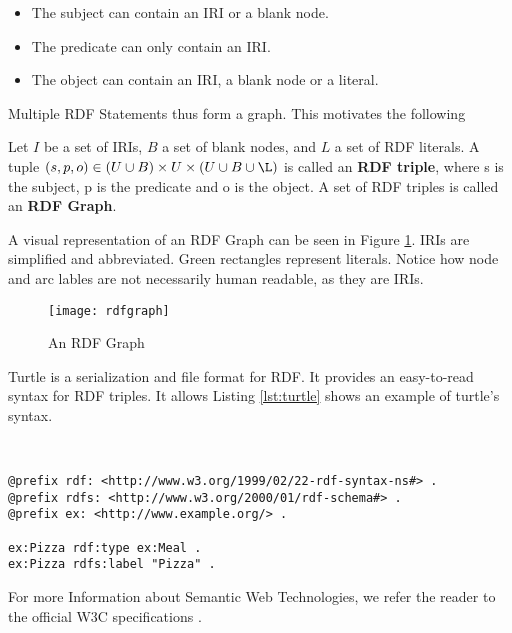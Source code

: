 \begin{itemize}
    \item The subject can contain an IRI or a blank node.
    \item The predicate can only contain an IRI.
    \item The object can contain an IRI, a blank node or a literal.
\end{itemize}

Multiple RDF Statements thus form a graph. This motivates the following

\begin{definition}
    Let $I$ be a set of IRIs, $B$ a set of blank nodes, and $L$ a set of RDF literals. A tuple $\displaystyle (s,p,o) \in (U \cup B) \times U \times (U \cup B \cup \L)$ is called an \textbf{RDF triple}, where s is the subject, p is the predicate and o is the object. A set of RDF triples is called an \textbf{RDF Graph}.
\end{definition}

A visual representation of an RDF Graph can be seen in Figure \ref{fig:rdfgraph}. IRIs are simplified and abbreviated. Green rectangles represent literals. Notice how node and arc lables are not necessarily human readable, as they are IRIs. 

\begin{figure}[H]
    \centering
    \texttt{[image: rdfgraph]}
    \caption[]{An RDF Graph}
    \label{fig:rdfgraph}
\end{figure}

Turtle is a serialization and file format for RDF. It provides an easy-to-read syntax for RDF triples. It allows  Listing \ref{lst:turtle} shows an example of turtle's syntax.

\

\begin{lstlisting}[caption={turtle example}, label=lst:turtle]
@prefix rdf: <http://www.w3.org/1999/02/22-rdf-syntax-ns#> .
@prefix rdfs: <http://www.w3.org/2000/01/rdf-schema#> .
@prefix ex: <http://www.example.org/> .

ex:Pizza rdf:type ex:Meal .
ex:Pizza rdfs:label "Pizza" .

\end{lstlisting}

For more Information about Semantic Web Technologies, we refer the reader to the official W3C specifications \cite{rdf, rdfs, owl, turtle, sparql, xsd}.